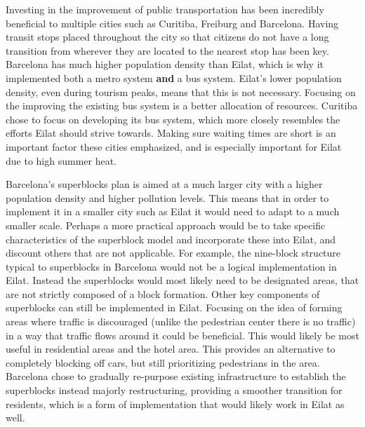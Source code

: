 \documentclass[12pt]{article}                               %
\begin{document}
Investing in the improvement of public transportation has been incredibly beneficial to multiple cities such as Curitiba, Freiburg and Barcelona. Having transit stops placed throughout the city so that citizens do not have a long transition from wherever they are located to the nearest stop has been key. Barcelona has much higher population density than Eilat, which is why it implemented both a metro system \textbf{and} a bus system. Eilat's lower population density, even during tourism peaks, means that this is not necessary. Focusing on the improving the existing bus system is a better allocation of resources. Curitiba chose to focus on developing its bus system, which more closely resembles the efforts Eilat should strive towards. Making sure waiting times are short is an important factor these cities emphasized, and is especially important for Eilat due to high summer heat. 

Barcelona's superblocks plan is aimed at a much larger city with a higher population density and higher pollution levels. This means that in order to implement it in a smaller city such as Eilat it would need to adapt to a much smaller scale. Perhaps a more practical approach would be to take specific characteristics of the superblock model and incorporate these into Eilat, and discount others that are not applicable. For example, the nine-block structure typical to superblocks in Barcelona would not be a logical implementation in Eilat. Instead the superblocks would most likely need to be designated areas, that are not strictly composed of a block formation. Other key components of superblocks can still be implemented in Eilat. Focusing on the idea of forming areas where traffic is discouraged (unlike the pedestrian center there is no traffic) in a way that traffic flows around it could be beneficial. This would likely be most useful in residential areas and the hotel area. This provides an alternative to completely blocking off cars, but still prioritizing pedestrians in the area. Barcelona chose to gradually re-purpose existing infrastructure to establish the superblocks instead majorly restructuring, providing a smoother transition for residents, which is a form of implementation that would likely work in Eilat as well. 
\end{document}
